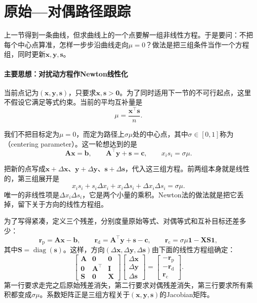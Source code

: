 \section{原始—对偶路径跟踪}
\label{sec:lpipm-path-following}

上一节得到一条曲线，但求曲线上的一个点要解一组非线性方程。于是要问：不把每个中心点算准，怎样一步步沿曲线走向$\mu=0$？做法是把三组条件当作一个方程组，同时更新$\bm{x},\bm{y},\bm{s}$。

\paragraph{主要思想：对扰动方程作Newton线性化}
当前点记为$(\bm{x},\bm{y},\bm{s})$，只要求$\bm{x},\bm{s}>\bm{0}$。为了同时适用下一节的不可行起点，这里不假设它满足等式约束。当前的平均互补量是
\begin{equation}
 \mu=\frac{\bm{x}^\top\bm{s}}{n}.
 \label{eq:lpipm-mu}
\end{equation}

我们不把目标定为$\mu=0$，而定为路径上$\sigma\mu$处的中心点，其中$\sigma\in[0,1]$称为（centering parameter）。这一轮想达到的是
\[
 \bm{A}\bm{x}=\bm{b},\qquad\bm{A}^\top\bm{y}+\bm{s}=\bm{c},\qquad x_is_i=\sigma\mu.
\]

把新的点写成$\bm{x}+\Delta\bm{x}$、$\bm{y}+\Delta\bm{y}$、$\bm{s}+\Delta\bm{s}$，代入这三组方程。前两组本身就是线性的，第三组展开是
\[
 x_is_i+s_i\Delta x_i+x_i\Delta s_i+\Delta x_i\Delta s_i=\sigma\mu.
\]
唯一的非线性项是$\Delta x_i\Delta s_i$，它是两个小量的乘积。Newton法的做法就是把它丢掉，留下关于方向的线性方程组。

为了写得紧凑，定义三个残差，分别度量原始等式、对偶等式和互补目标还差多少：
\begin{equation}
 \bm{r}_{\mathrm{p}}=\bm{A}\bm{x}-\bm{b},\qquad
 \bm{r}_{\mathrm{d}}=\bm{A}^\top\bm{y}+\bm{s}-\bm{c},\qquad
 \bm{r}_{\mathrm{c}}=\sigma\mu\bm{1}-\bm{X}\bm{S}\bm{1},
 \label{eq:lpipm-residuals}
\end{equation}
其中$\bm{S}=\operatorname{diag}(\bm{s})$。这样，方向$(\Delta\bm{x},\Delta\bm{y},\Delta\bm{s})$由下面的线性方程组确定：
\begin{equation}
 \begin{bmatrix}
 \bm{A}&\bm{0}&\bm{0}\\
 \bm{0}&\bm{A}^\top&\bm{I}\\
 \bm{S}&\bm{0}&\bm{X}
 \end{bmatrix}
 \begin{bmatrix}\Delta\bm{x}\\\Delta\bm{y}\\\Delta\bm{s}\end{bmatrix}
 =
 \begin{bmatrix}-\bm{r}_{\mathrm{p}}\\-\bm{r}_{\mathrm{d}}\\\bm{r}_{\mathrm{c}}\end{bmatrix}.
 \label{eq:lpipm-newton}
\end{equation}
第一行要求走完之后原始残差消失，第二行要求对偶残差消失，第三行要求所有乘积都变成$\sigma\mu$。系数矩阵正是三组方程关于$(\bm{x},\bm{y},\bm{s})$的Jacobian矩阵。

